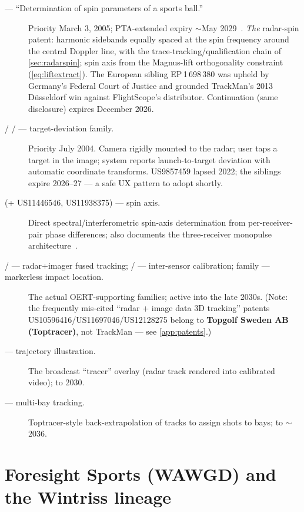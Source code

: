 \begin{description}
\item[ --- ``Determination of spin parameters of a
sports ball.''] Priority March 3, 2005; PTA-extended expiry
$\sim$May 2029~\cite{us8845442}. \emph{The} radar-spin patent: harmonic
sidebands equally spaced at the spin frequency around the central Doppler
line, with the trace-tracking/qualification chain of
\cref{sec:radarspin}; spin axis from the Magnus-lift orthogonality
constraint (\cref{eq:liftextract}). The European sibling EP\,1\,698\,380
was upheld by Germany's Federal Court of Justice and grounded TrackMan's
2013 Düsseldorf win against FlightScope's distributor. Continuation
 (same disclosure) expires December 2026.
\item[ /  /
 --- target-deviation family.] Priority July 2004.
Camera rigidly mounted to the radar; user taps a target in the image;
system reports launch-to-target deviation with automatic coordinate
transforms. US9857459 lapsed 2022; the siblings expire 2026--27 --- a
safe UX pattern to adopt shortly.
\item[ (+ US11446546, US11938375) --- spin axis.]
Direct spectral/interferometric spin-axis determination from
per-receiver-pair phase differences; also documents the three-receiver
monopulse architecture~\cite{us10850179}.
\item[ /  --- radar+imager
fused tracking;  /  ---
inter-sensor calibration;  family --- markerless
impact location.] The actual OERT-supporting families; active into the
late 2030s. (Note: the frequently mis-cited ``radar + image data 3D
tracking'' patents US10596416/US11697046/US12128275 belong to
\textbf{Topgolf Sweden AB (Toptracer)}, not TrackMan --- see
\cref{app:patents}.)
\item[ --- trajectory illustration.] The broadcast
``tracer'' overlay (radar track rendered into calibrated video); to 2030.
\item[ --- multi-bay tracking.] Toptracer-style
back-extrapolation of tracks to assign shots to bays; to $\sim$2036.
\end{description}

\section{Foresight Sports (WAWGD) and the Wintriss lineage}
\label{sec:wintriss}

